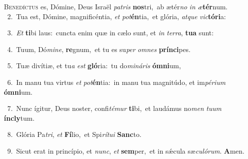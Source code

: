\lettrine{\initial\textcolor{\initialcolor}{B}}{enedíctus} es, Dómine, Deus Israël \textit{pa}\-\textit{tris} \textbf{nos}\-tri,~\star ab ætér\textit{no} \textit{in} \textit{æ}\-\textbf{tér}num.\\
{\numbfont\textcolor{\numbcolor}{~2.}}~Tua est, Dómine, magnificéntia, \textit{et} \textit{pot}\-\textbf{én}tia,~\star et glória, \textit{at}\-\textit{que} \textit{vic}\-\textbf{tó}\textbf{ri}a:\par
{\numbfont\textcolor{\numbcolor}{~3.}}~\textit{Et} \textbf{ti}\-bi laus:~\star cuncta enim quæ in cælo sunt, et \textit{in} \textit{ter}\-\textit{ra}, \textbf{tu}\-\textbf{a} sunt:\par
{\numbfont\textcolor{\numbcolor}{~4.}}~Tuum, Dó\-\textit{mi}\-\textit{ne}, \textbf{re}\-gnum,~\star et tu es su\textit{per} \textit{om}\-\textit{nes} \textbf{prín}\-\textbf{ci}pes.\par
{\numbfont\textcolor{\numbcolor}{~5.}}~Tuæ divítiæ, et tu\textit{a} \textit{est} \textbf{gló}\-ria:~\star tu do\-\textit{mi}\-\textit{ná}\textit{ris} \textbf{óm}\-\textbf{ni}um,\par
{\numbfont\textcolor{\numbcolor}{~6.}}~In manu tua virtus \textit{et} \textit{pot}\-\textbf{én}tia:~\star in manu tua magnitúdo, et im\-\textit{pé}\-\textit{ri}\textit{um} \textbf{óm}\-\textbf{ni}um.\par
{\numbfont\textcolor{\numbcolor}{~7.}}~Nunc ígitur, Deus noster, confi\-\textit{té}\-\textit{mur} \textbf{ti}\-bi,~\star et laudámus no\textit{men} \textit{tu}\-\textit{um} \textbf{ín}\-\textbf{cly}tum.\par
{\numbfont\textcolor{\numbcolor}{~8.}}~Glória Pa\-\textit{tri}\-, \textit{et} \textbf{Fí}\-lio,~\star et Spi\-\textit{rí}\-\textit{tu}\textit{i} \textbf{Sanc}\-to.\par
{\numbfont\textcolor{\numbcolor}{~9.}}~Sicut erat in princípio, et \textit{nunc}\-, \textit{et} \textbf{sem}\-per,~\star et in sǽcula sæ\-\textit{cu}\-\textit{ló}\textit{rum}. \textbf{A}\-men.\par

